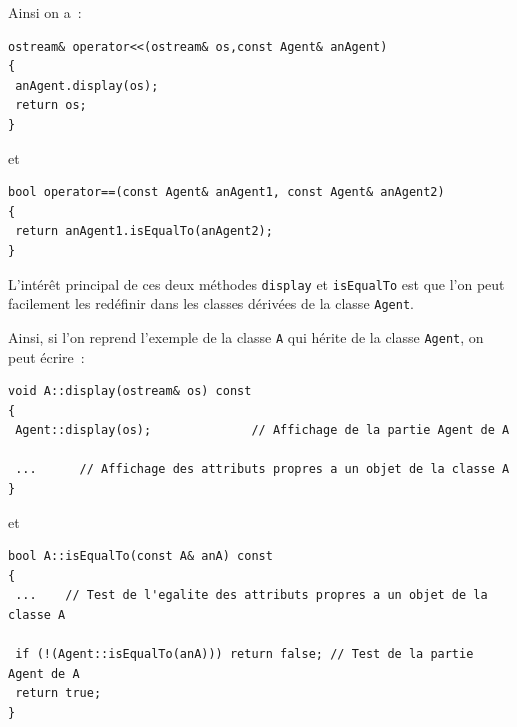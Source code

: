 \documentclass[12pt]{article}
\begin{document}

Ainsi on a~:
\begin{footnotesize}
\begin{verbatim}
ostream& operator<<(ostream& os,const Agent& anAgent)
{
 anAgent.display(os);
 return os;
}
\end{verbatim}
\end{footnotesize}
et
\vspace{-0.15cm}
\begin{footnotesize}
\begin{verbatim}
bool operator==(const Agent& anAgent1, const Agent& anAgent2)
{
 return anAgent1.isEqualTo(anAgent2);
}
\end{verbatim}
\end{footnotesize}

L'int\'er\^et principal de ces deux m\'ethodes {\tt display} et
{\tt isEqualTo} est que l'on peut facilement les red\'efinir dans
les classes d\'eriv\'ees de la classe {\tt Agent}.

\vspace{0.2cm}

Ainsi, si l'on reprend l'exemple de la classe {\tt A} qui h\'erite
de la classe {\tt Agent}, on peut \'ecrire~:
\begin{footnotesize}
\begin{verbatim}
void A::display(ostream& os) const
{
 Agent::display(os);              // Affichage de la partie Agent de A

 ...      // Affichage des attributs propres a un objet de la classe A
}
\end{verbatim}
\end{footnotesize}
\vspace{-0.15cm}
et
\vspace{-0.15cm}
\begin{footnotesize}
\begin{verbatim}
bool A::isEqualTo(const A& anA) const
{
 ...    // Test de l'egalite des attributs propres a un objet de la classe A

 if (!(Agent::isEqualTo(anA))) return false; // Test de la partie Agent de A
 return true;
}
\end{verbatim}
\end{footnotesize}
\end{document}
